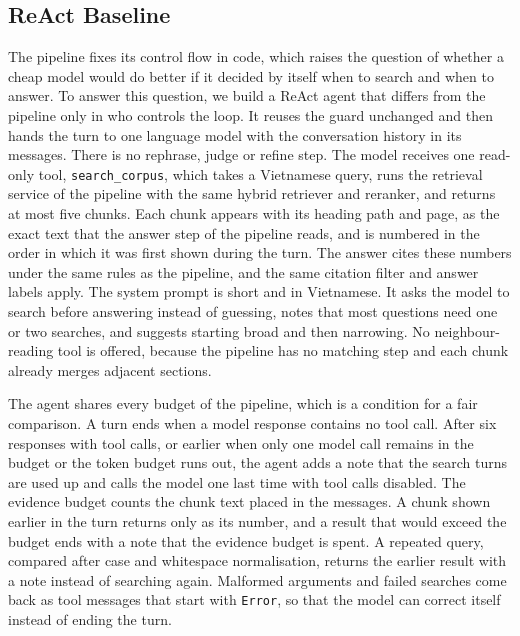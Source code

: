 \subsection{ReAct Baseline}\label{sec:react}

The pipeline fixes its control flow in code, which raises the question of whether a cheap model would do better if it decided by itself when to search and when to answer. %
To answer this question, we build a ReAct agent that differs from the pipeline only in who controls the loop. It reuses the guard unchanged and then hands the turn to one language model with the conversation history in its messages. There is no rephrase, judge or refine step. The model receives one read-only tool, \texttt{search\_corpus}, which takes a Vietnamese query, runs the retrieval service of the pipeline with the same hybrid retriever and reranker, and returns at most five chunks. Each chunk appears with its heading path and page, as the exact text that the answer step of the pipeline reads, and is numbered in the order in which it was first shown during the turn. The answer cites these numbers under the same rules as the pipeline, and the same citation filter and answer labels apply. The system prompt is short and in Vietnamese. It asks the model to search before answering instead of guessing, notes that most questions need one or two searches, and suggests starting broad and then narrowing. No neighbour-reading tool is offered, because the pipeline has no matching step and each chunk already merges adjacent sections.

The agent shares every budget of the pipeline, which is a condition for a fair comparison. A turn ends when a model response contains no tool call. After six responses with tool calls, or earlier when only one model call remains in the budget or the token budget runs out, the agent adds a note that the search turns are used up and calls the model one last time with tool calls disabled. The evidence budget counts the chunk text placed in the messages. A chunk shown earlier in the turn returns only as its number, and a result that would exceed the budget ends with a note that the evidence budget is spent. A repeated query, compared after case and whitespace normalisation, returns the earlier result with a note instead of searching again. Malformed arguments and failed searches come back as tool messages that start with \texttt{Error}, so that the model can correct itself instead of ending the turn.

